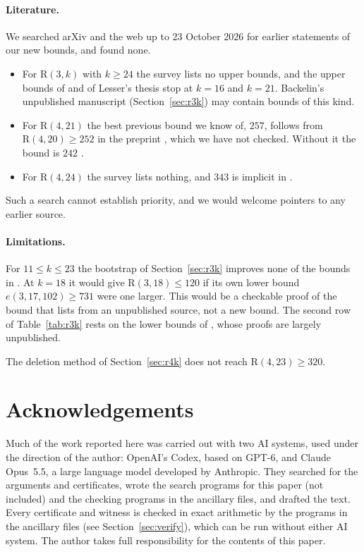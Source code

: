 \documentclass[11pt]{article}
\theoremstyle{spacedplain}
\theoremstyle{spaceddef}
\theoremstyle{spacedremark}
\newcommand{\R}{\mathrm{R}}
\begin{document}
\paragraph{Literature.}
We searched arXiv and the web up to 23 October 2026 for earlier statements of our new bounds, and found none.
\begin{itemize}
\item For $\R(3,k)$ with $k\ge 24$ the survey lists no upper bounds, and the upper bounds of \cite{GR13} and of Lesser's thesis \cite{Les} stop at $k=16$ and $k=21$.
Backelin's unpublished manuscript (Section~\ref{sec:r3k}) may contain bounds of this kind.
\item For $\R(4,21)$ the best previous bound we know of, $257$, follows from $\R(4,20)\ge 252$ in the preprint \cite{Yu26}, which we have not checked.
Without it the bound is $242$ \cite{SLZL}.
\item For $\R(4,24)$ the survey lists nothing, and $343$ is implicit in \cite{LinCa}.
\end{itemize}
Such a search cannot establish priority, and we would welcome pointers to any earlier source.

\paragraph{Limitations.}
For $11\le k\le 23$ the bootstrap of Section~\ref{sec:r3k} improves none of the bounds in \cite{Rad26}.
At $k=18$ it would give $\R(3,18)\le 120$ if its own lower bound $e(3,17,102)\ge 731$ were one larger.
This would be a checkable proof of the bound that \cite{Rad26} lists from an unpublished source, not a new bound.
The second row of Table~\ref{tab:r3k} rests on the lower bounds of \cite{Back3}, whose proofs are largely unpublished.

The deletion method of Section~\ref{sec:r4k} does not reach $\R(4,23)\ge 320$.

\section*{Acknowledgements}
Much of the work reported here was carried out with two AI systems, used under the direction of the author: OpenAI's Codex, based on GPT-6, and Claude Opus~5.5, a large language model developed by Anthropic.
They searched for the arguments and certificates, wrote the search programs for this paper (not included) and the checking programs in the ancillary files, and drafted the text.
Every certificate and witness is checked in exact arithmetic by the programs in the ancillary files (see Section~\ref{sec:verify}), which can be run without either AI system.
The author takes full responsibility for the contents of this paper.
\end{document}
